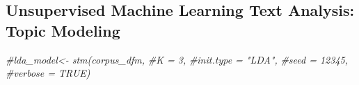 \documentclass[
]{article}
\newenvironment{Shaded}{\begin{snugshade}}{\end{snugshade}}
\newcommand{\CommentTok}[1]{\textcolor[rgb]{0.56,0.35,0.01}{\textit{#1}}}
\begin{document}
\hypertarget{unsupervised-machine-learning-text-analysis-topic-modeling}{%
\subsection{Unsupervised Machine Learning Text Analysis: Topic
Modeling}\label{unsupervised-machine-learning-text-analysis-topic-modeling}}

\begin{Shaded}
\begin{Highlighting}[]
\CommentTok{\#lda\_model\textless{}{-} stm(corpus\_dfm,                                                 }
               \CommentTok{\#K = 3,}
               \CommentTok{\#init.type = "LDA", }
               \CommentTok{\#seed = 12345,}
               \CommentTok{\#verbose = TRUE)}
\end{Highlighting}
\end{Shaded}
\end{document}
